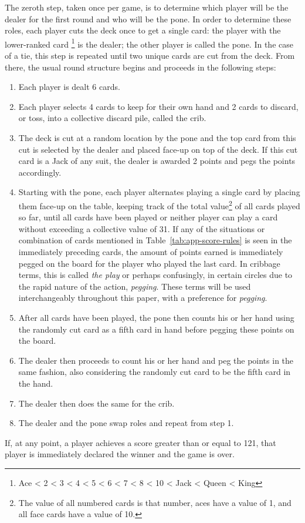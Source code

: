The zeroth step, taken once per game, is to determine which player will be the
dealer for the first round and who will be the pone.
%
In order to determine these roles,
each player cuts the deck once to get a single card:
the player with the lower-ranked card%
\footnote{Ace < 2 < 3 < 4 < 5 < 6 < 7 < 8 < 10 < Jack < Queen < King}
is the dealer;
the other player is called the pone.
In the case of a tie, this step is repeated until two unique cards are
cut from the deck.
%
From there, the usual round structure begins and proceeds in the following
steps:
%
\begin{enumerate} %
%
\item Each player is dealt 6 cards.
%
\item Each player selects 4 cards to keep for their own hand and 2 cards to
	discard, or toss, into a collective discard pile, called the crib.
%
\item The deck is cut at a random location by the pone
	and the top card from this cut is selected by the dealer and placed
	face-up on top of the deck.
	If this cut card is a Jack of any suit,
	the dealer is awarded 2 points and pegs the points accordingly.
%
\item Starting with the pone, each player alternates playing a single card
	by placing them face-up on the table,
	keeping track of the total value\footnote{
		The value of all numbered cards is that number, aces have
		a value of 1, and all face cards have a value of 10.
	}%
	of all cards played so far,
	until all cards have been played
	or neither player can play a card without exceeding a collective value of
	31.
	If any of the situations or combination of cards mentioned in
	Table~\ref{tab:app-score-rules} is seen in the immediately preceding cards,
	the amount of points earned is immediately pegged on the board for the
	player who played the last card.
	In cribbage terms, this is called \textit{the play}
	or perhaps confusingly,
	in certain circles due to the rapid nature of the
	action, \textit{pegging}.
	These terms will be used interchangeably throughout this paper,
	with a preference for \textit{pegging}.
%
\item After all cards have been played,
	the pone then counts his or her hand using the randomly cut card as a
	fifth card in hand before pegging these points on the board.
%
\item The dealer then proceeds to count his or her hand and peg the points
	in the same fashion, also considering the randomly cut card to be the
	fifth card in the hand.
%
\item The dealer then does the same for the crib.
%
\item The dealer and the pone swap roles and repeat from step 1.
%
\end{enumerate}
%
If, at any point, a player achieves a score greater than or equal to 121,
that player is immediately declared the winner and the game is over.



